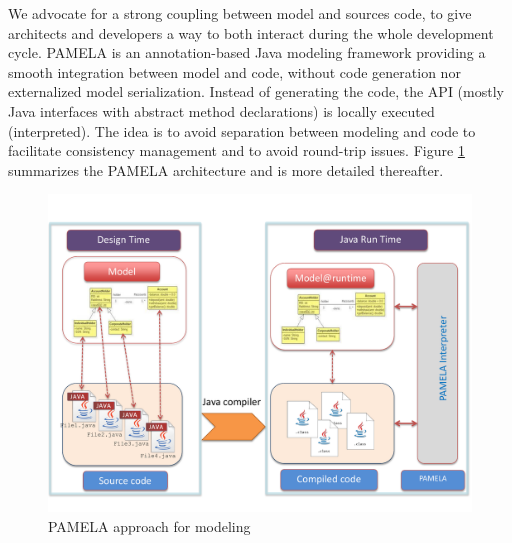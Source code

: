 We advocate for a strong coupling between model and sources code, to give architects and developers a way to both interact during the whole development cycle. PAMELA is an annotation-based Java modeling framework providing a smooth integration between model and code, without code generation nor externalized model serialization. Instead of generating the code, the API (mostly Java interfaces with abstract method declarations) is locally executed (interpreted). The idea is to avoid separation between modeling and code to facilitate consistency management and to avoid round-trip issues. Figure \ref{fig:PamelaVision} summarizes the PAMELA architecture and is more detailed thereafter.  

\begin{figure}
    \centering
    \includegraphics[width=1.0 \columnwidth]{PamelaVisionV2.pdf}
    \caption{PAMELA approach for modeling}
    \label{fig:PamelaVision}
\end{figure}


